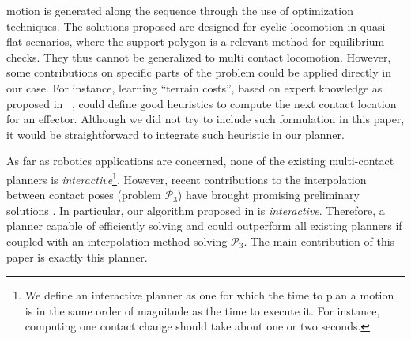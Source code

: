 \documentclass[journal]{IEEEtran}
\newcommand{\gls}[1]{\textit{#1}}
\begin{document}
motion is generated along the sequence through the use of optimization techniques. 
The solutions proposed are designed for cyclic locomotion in quasi-flat scenarios, where the support polygon is a relevant method for equilibrium checks. They thus cannot be generalized to multi contact locomotion. 
However, some contributions on specific parts of the problem could be applied directly in our case. 
For instance, learning ``terrain costs'', based on expert knowledge as proposed in ~\cite{Ratliff:2009:LSF:1569248.1569253}, could define good heuristics to compute the next contact location for an effector. Although we did not try to include such formulation in this paper, it would be straightforward to integrate such heuristic in our planner.


As far as robotics applications are concerned, none of the existing multi-contact planners is \gls{interactive}\footnote{We define an interactive planner as one for which the time to plan a motion is in the same order of magnitude as the time to execute it. For instance, computing one contact change should take about one or two seconds.}.
However, recent contributions to the interpolation between contact poses (problem $\mathcal{P}_3$) have brought promising preliminary solutions \citep{Carpentier2016,Hauser2014, herzog2015trajectory, Park116}. In particular, our algorithm proposed in \cite{Carpentier2016} is \gls{interactive}.
Therefore, a planner capable of efficiently solving \Pa and \Pb could outperform all existing planners if coupled with an interpolation method solving $\mathcal{P}_3$.
The main contribution of this paper is exactly this planner.
\end{document}
